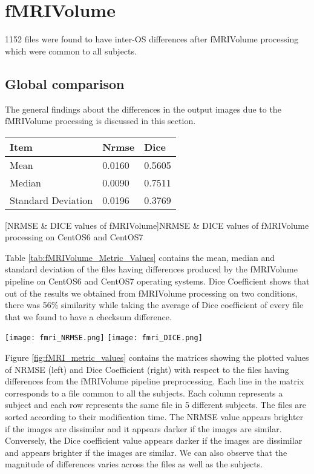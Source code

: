 \section{fMRIVolume}\label{sec:fMRI}
1152 files were found to have inter-OS differences after fMRIVolume processing which were common to all subjects.
\subsection{Global comparison}
The general findings about the differences in the output images due to the fMRIVolume processing is discussed in this section.

\begin{center}
\begin{tabular}{|l|l|l|}
\hline
\textbf{Item}      & \textbf{Nrmse}  & \textbf{Dice} \\ \hline
Mean               & 0.0160     & 0.5605   \\ \hline
Median             & 0.0090     & 0.7511   \\ \hline
Standard Deviation & 0.0196     & 0.3769   \\ \hline
\end{tabular}
  [NRMSE \& DICE values of fMRIVolume]{NRMSE \& DICE values of fMRIVolume processing on CentOS6 and CentOS7}
\label{tab:fMRIVolume_Metric_Values}
\end{center}

Table \ref{tab:fMRIVolume_Metric_Values} contains the mean, median and standard deviation of the files having differences produced by the fMRIVolume pipeline on CentOS6 and CentOS7 operating systems. Dice Coefficient shows that out of the results we obtained from fMRIVolume processing on two conditions, there was 56\% similarity while taking the average of Dice coefficient of every file that we found to have a checksum difference.

\begin{center}
\texttt{[image: fmri\_NRMSE.png]}%
\texttt{[image: fmri\_DICE.png]}
\caption*{(i) NRMSE (left) (ii)Dice Coefficient (right)}
\label{fig:fMRI_metric_values}
\end{center}

Figure \ref{fig:fMRI_metric_values} contains the matrices showing the plotted values of NRMSE (left) and Dice Coefficient (right) with respect to the files having differences from the fMRIVolume pipeline preprocessing. Each line in the matrix corresponds to a file common to all the subjects. Each column represents a subject and each row represents the same file in 5 different subjects. The files are sorted according to their modification time. The NRMSE value appears brighter if the images are dissimilar and it appears darker if the images are similar. Conversely, the Dice coefficient value appears darker if the images are dissimilar and appears brighter if the images are similar. We can also observe that the magnitude of differences varies across the files as well as the subjects.

